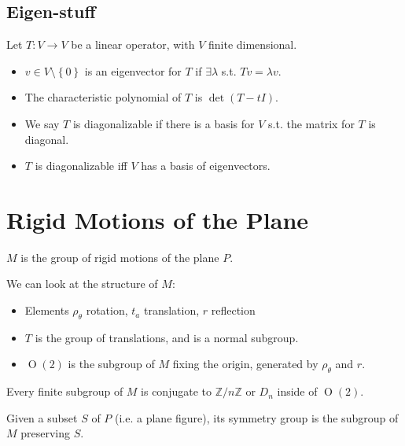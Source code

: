 \documentclass[10pt,letterpaper]{article}
\newcommand{\n}{\hfill\break}
\newcommand{\set}[1]{\left\{#1\right\}}
\newcommand{\integers}{\mathbb{Z}}
\newcommand{\Z}{\integers}
\newcommand{\cut}{\setminus}
\newcommand{\Id}{\textrm{\textnormal{Id}}}
\newcommand{\st}{s.t.}
\begin{document}
\subsection*{Eigen-stuff}

\par\noindent
Let $T:V\to{}V$ be a linear operator, with $V$ finite dimensional.
\begin{itemize}
	\item $v\in{}V\cut\set{0}$ is an eigenvector for $T$ if $\exists\lambda$ \st{} $Tv=\lambda{}v$.
	\item The characteristic polynomial of $T$ is $\det(T-tI)$.
	\item We say $T$ is diagonalizable if there is a basis for $V$ \st{} the matrix for $T$ is diagonal.
	\item $T$ is diagonalizable iff $V$ has a basis of eigenvectors.
\end{itemize}

\section{Rigid Motions of the Plane}

\par\noindent
$M$ is the group of rigid motions of the plane $P$.\n

\par\noindent
We can look at the structure of $M$:
\begin{itemize}
	\item Elements $\rho_{\theta}$ rotation, $t_{a}$ translation, $r$ reflection
	\item $T$ is the group of translations, and is a normal subgroup.
	\item $\operatorname{O}(2)$ is the subgroup of $M$ fixing the origin, generated by $\rho_{\theta}$ and $r$.
\end{itemize}

\begin{center}
\end{center}

\par\noindent
Every finite subgroup of $M$ is conjugate to $\Z/n\Z$ or $D_{n}$ inside of $\operatorname{O}(2)$.\n

\par\noindent
Given a subset $S$ of $P$ (i.e. a plane figure), its symmetry group is the subgroup of $M$ preserving $S$.
\end{document}
